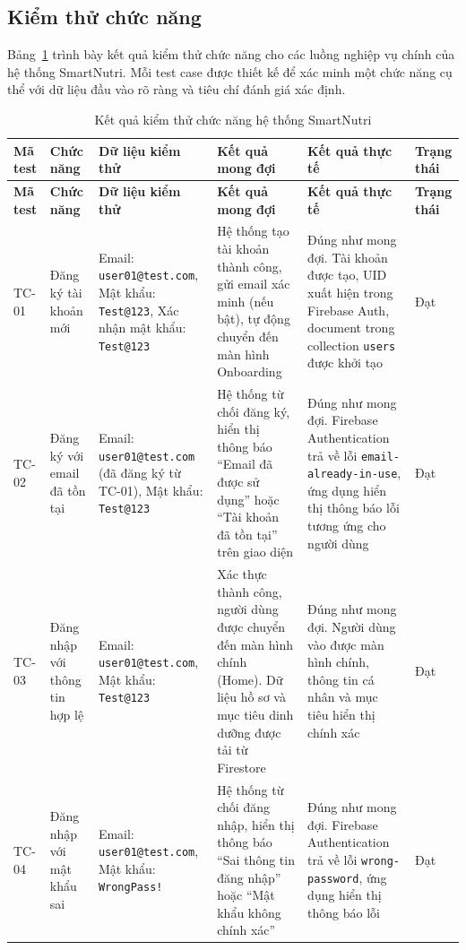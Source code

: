 \subsection{Kiểm thử chức năng}

Bảng~\ref{tab:functional_test} trình bày kết quả kiểm thử chức năng cho các luồng nghiệp vụ chính của hệ thống SmartNutri. Mỗi test case được thiết kế để xác minh một chức năng cụ thể với dữ liệu đầu vào rõ ràng và tiêu chí đánh giá xác định.

\begingroup
\small
\begin{longtable}{|p{1.2cm}|p{2.8cm}|p{3.2cm}|p{3.2cm}|p{2.8cm}|p{1.5cm}|}
    \caption{Kết quả kiểm thử chức năng hệ thống SmartNutri}
    \label{tab:functional_test} \\
    \hline
    \textbf{Mã test} & \textbf{Chức năng} & \textbf{Dữ liệu kiểm thử} & \textbf{Kết quả mong đợi} & \textbf{Kết quả thực tế} & \textbf{Trạng thái} \\
    \hline
    \endfirsthead
    \hline
    \textbf{Mã test} & \textbf{Chức năng} & \textbf{Dữ liệu kiểm thử} & \textbf{Kết quả mong đợi} & \textbf{Kết quả thực tế} & \textbf{Trạng thái} \\
    \hline
    \endhead
    \hline
    \endfoot
    TC-01 & Đăng ký tài khoản mới & Email: \texttt{user01@test.com}, Mật khẩu: \texttt{Test@123}, Xác nhận mật khẩu: \texttt{Test@123} & Hệ thống tạo tài khoản thành công, gửi email xác minh (nếu bật), tự động chuyển đến màn hình Onboarding & Đúng như mong đợi. Tài khoản được tạo, UID xuất hiện trong Firebase Auth, document trong collection \texttt{users} được khởi tạo & Đạt \\
    \hline
    TC-02 & Đăng ký với email đã tồn tại & Email: \texttt{user01@test.com} (đã đăng ký từ TC-01), Mật khẩu: \texttt{Test@123} & Hệ thống từ chối đăng ký, hiển thị thông báo ``Email đã được sử dụng'' hoặc ``Tài khoản đã tồn tại'' trên giao diện & Đúng như mong đợi. Firebase Authentication trả về lỗi \texttt{email-already-in-use}, ứng dụng hiển thị thông báo lỗi tương ứng cho người dùng & Đạt \\
    \hline
    TC-03 & Đăng nhập với thông tin hợp lệ & Email: \texttt{user01@test.com}, Mật khẩu: \texttt{Test@123} & Xác thực thành công, người dùng được chuyển đến màn hình chính (Home). Dữ liệu hồ sơ và mục tiêu dinh dưỡng được tải từ Firestore & Đúng như mong đợi. Người dùng vào được màn hình chính, thông tin cá nhân và mục tiêu hiển thị chính xác & Đạt \\
    \hline
    TC-04 & Đăng nhập với mật khẩu sai & Email: \texttt{user01@test.com}, Mật khẩu: \texttt{WrongPass!} & Hệ thống từ chối đăng nhập, hiển thị thông báo ``Sai thông tin đăng nhập'' hoặc ``Mật khẩu không chính xác'' & Đúng như mong đợi. Firebase Authentication trả về lỗi \texttt{wrong-password}, ứng dụng hiển thị thông báo lỗi & Đạt \\

\end{longtable}
